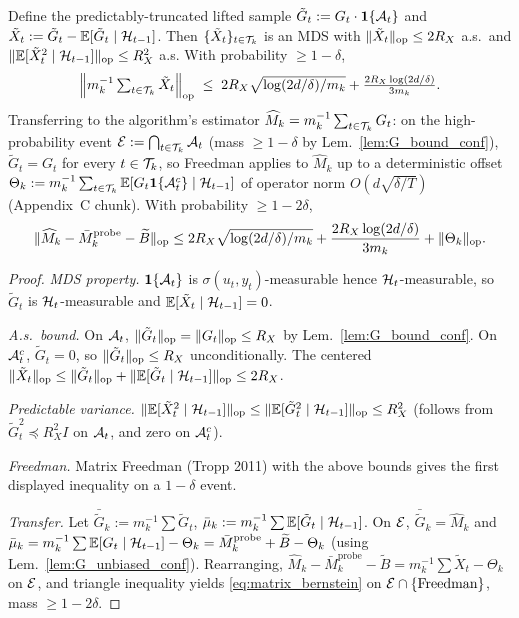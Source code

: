 \begin{theorem}
\label{thm:matrix_bernstein_conf}
Define the predictably-truncated lifted sample
$\tilde G_t := G_t\cdot\mathbf 1\{\mathcal{A}_t\}$ and
$\tilde X_t := \tilde G_t - \mathbb{E}[\tilde G_t\mid\mathcal{H}_{t-1}]$.
Then $\{\tilde X_t\}_{t\in\mathcal{T}_k}$ is an MDS with
$\|\tilde X_t\|_{\mathrm{op}}\le 2R_X$ a.s.\ and
$\|\mathbb{E}[\tilde X_t^2\mid\mathcal{H}_{t-1}]\|_{\mathrm{op}}\le R_X^2$ a.s. With probability
$\ge 1-\delta$,
\begin{equation}
  \Bigl\|m_k^{-1}\textstyle\sum_{t\in\mathcal{T}_k}\tilde X_t\Bigr\|_{\mathrm{op}}
  \;\le\; 2R_X\sqrt{\log(2d/\delta)/m_k} + \tfrac{2R_X\log(2d/\delta)}{3m_k}.
\end{equation}
Transferring to the algorithm's estimator
$\widehat M_k=m_k^{-1}\sum_{t\in\mathcal{T}_k}G_t$: on the high-probability
event $\mathcal{E} := \bigcap_{t\in\mathcal{T}_k}\mathcal{A}_t$ (mass $\ge 1-\delta$ by
Lem.~\ref{lem:G_bound_conf}), $\tilde G_t = G_t$ for every $t\in\mathcal{T}_k$,
so Freedman applies to $\widehat M_k$ up to a deterministic offset
$\Theta_k := m_k^{-1}\sum_{t\in\mathcal{T}_k}\mathbb{E}[G_t\mathbf 1\{\mathcal{A}_t^c\}\mid\mathcal{H}_{t-1}]$
of operator norm $O(d\sqrt{\delta/T})$ (Appendix~C chunk). With
probability $\ge 1-2\delta$,
\begin{equation}
\|\widehat M_k - \bar M_k^{\mathrm{probe}} - \widetilde B\|_{\mathrm{op}}
\le 2R_X\sqrt{\log(2d/\delta)/m_k} + \frac{2R_X\log(2d/\delta)}{3m_k}
+ \|\Theta_k\|_{\mathrm{op}}.
\label{eq:matrix_bernstein}
\end{equation}
\end{theorem}
\begin{proof}
\emph{MDS property.} $\mathbf 1\{\mathcal{A}_t\}$ is $\sigma(u_t,y_t)$-measurable
hence $\mathcal{H}_t$-measurable, so $\tilde G_t$ is $\mathcal{H}_t$-measurable and
$\mathbb{E}[\tilde X_t\mid\mathcal{H}_{t-1}]=0$.

\emph{A.s.\ bound.} On $\mathcal{A}_t$, $\|\tilde G_t\|_{\mathrm{op}}=\|G_t\|_{\mathrm{op}}\le R_X$
by Lem.~\ref{lem:G_bound_conf}. On $\mathcal{A}_t^c$, $\tilde G_t=0$, so
$\|\tilde G_t\|_{\mathrm{op}}\le R_X$ unconditionally. The centered
$\|\tilde X_t\|_{\mathrm{op}}\le\|\tilde G_t\|_{\mathrm{op}}+\|\mathbb{E}[\tilde G_t\mid\mathcal{H}_{t-1}]\|_{\mathrm{op}}\le 2R_X$.

\emph{Predictable variance.}
$\|\mathbb{E}[\tilde X_t^2\mid\mathcal{H}_{t-1}]\|_{\mathrm{op}}\le\|\mathbb{E}[\tilde G_t^2\mid\mathcal{H}_{t-1}]\|_{\mathrm{op}}\le R_X^2$
(follows from $\tilde G_t^2\preceq R_X^2 I$ on $\mathcal{A}_t$, and zero on $\mathcal{A}_t^c$).

\emph{Freedman.} Matrix Freedman (Tropp 2011) with the above bounds
gives the first displayed inequality on a $1-\delta$ event.

\emph{Transfer.} Let $\bar{\tilde G}_k:=m_k^{-1}\sum\tilde G_t$,
$\bar\mu_k:=m_k^{-1}\sum\mathbb{E}[\tilde G_t\mid\mathcal{H}_{t-1}]$. On $\mathcal{E}$,
$\bar{\tilde G}_k=\widehat M_k$ and
$\bar\mu_k = m_k^{-1}\sum\mathbb{E}[G_t\mid\mathcal{H}_{t-1}]-\Theta_k
= \bar M_k^{\mathrm{probe}}+\widetilde B-\Theta_k$ (using
Lem.~\ref{lem:G_unbiased_conf}). Rearranging,
$\widehat M_k-\bar M_k^{\mathrm{probe}}-\widetilde B
= m_k^{-1}\sum\tilde X_t - \Theta_k$ on $\mathcal{E}$, and triangle inequality
yields \eqref{eq:matrix_bernstein} on $\mathcal{E}\cap\{\text{Freedman}\}$,
mass $\ge 1-2\delta$.
\end{proof}

